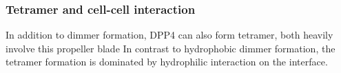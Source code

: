\subsubsection{Tetramer and cell-cell interaction}

In addition to dimmer formation, DPP4 can also form tetramer, both heavily involve this propeller blade In contrast to hydrophobic dimmer formation, the tetramer formation is dominated by hydrophilic interaction on the interface.~\cite{Engel_2003} 